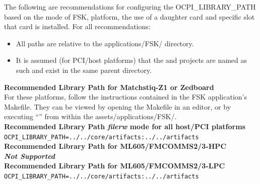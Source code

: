 \noindent The following are recommendations for configuring the OCPI\_LIBRARY\_PATH based on the mode of FSK, platform, the use of a daughter card and specific slot that card is installed. For all recommendations:
\begin{itemize}
  \item All paths are relative to the applications/FSK/ directory.\\
  \item It is assumed (for PCI/host platforms) that the  and  projects are named as such and exist in the same parent directory.\\
\end{itemize}

\noindent\textbf{Recommended Library Path for Matchstiq-Z1 or Zedboard}\\

\noindent
For these platforms, follow the instructions contained in the FSK application's Makefile. They can be viewed by opening the Makefile in an editor, or by executing ``'' from within the assets/applications/FSK/.\\

\noindent\textbf{Recommended Library Path \textit{filerw} mode for all host/PCI platforms}\\
\noindent
\verb|OCPI_LIBRARY_PATH=../../core/artifacts:../../artifacts| \\

\noindent\textbf{Recommended Library Path for ML605/FMCOMMS2/3-HPC}\\

\noindent
\noindent\textbf{\textit{Not Supported}}\\

\noindent\textbf{Recommended Library Path for ML605/FMCOMMS2/3-LPC}\\

\noindent
\verb|OCPI_LIBRARY_PATH=../../core/artifacts:../../artifacts| \\
\par\medskip

\newpage

\pagebreak

